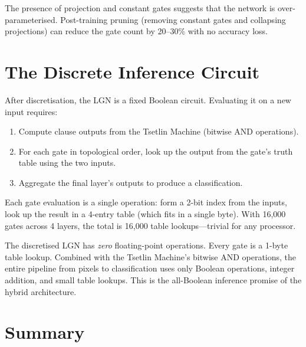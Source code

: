 \begin{engineernote}
The presence of projection and constant gates suggests that the
network is over-parameterised. Post-training pruning (removing
constant gates and collapsing projections) can reduce the gate
count by 20--30\% with no accuracy loss.
\end{engineernote}


\section{The Discrete Inference Circuit}
\label{sec:inference-circuit}

After discretisation, the LGN is a fixed Boolean circuit. Evaluating
it on a new input requires:

\begin{enumerate}
  \item Compute clause outputs from the Tsetlin Machine (bitwise AND
    operations).
  \item For each gate in topological order, look up the output from
    the gate's truth table using the two inputs.
  \item Aggregate the final layer's outputs to produce a
    classification.
\end{enumerate}

Each gate evaluation is a single operation: form a 2-bit index from
the inputs, look up the result in a 4-entry table (which fits in a
single byte). With 16,000 gates across 4 layers, the total is 16,000
table lookups---trivial for any processor.

\begin{keyinsight}
The discretised LGN has \emph{zero} floating-point operations. Every
gate is a 1-byte table lookup. Combined with the Tsetlin Machine's
bitwise AND operations, the entire pipeline from pixels to
classification uses only Boolean operations, integer addition, and
small table lookups. This is the all-Boolean inference promise of
the hybrid architecture.
\end{keyinsight}


\section{Summary}
\label{sec:ch9-summary}

